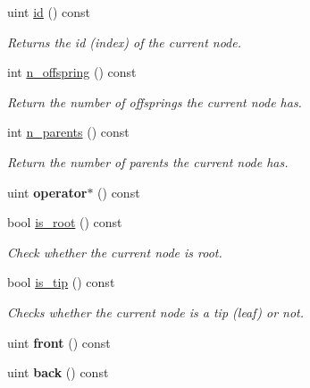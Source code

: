 \begin{DoxyCompactItemize}
uint \hyperlink{classTreeIterator_a6666dce3a0d78f229bd26942ebb3ad94}{id} () const
\begin{DoxyCompactList}\small\item\em Returns the id (index) of the current node. \end{DoxyCompactList}\item 
\mbox{\label{classTreeIterator_a5773c903501a1dc91b11429a365dcfab}} 
int \hyperlink{classTreeIterator_a5773c903501a1dc91b11429a365dcfab}{n\+\_\+offspring} () const
\begin{DoxyCompactList}\small\item\em Return the number of offsprings the current node has. \end{DoxyCompactList}\item 
\mbox{\label{classTreeIterator_a3f2217bed38e63f9adc7376ab2bc035f}} 
int \hyperlink{classTreeIterator_a3f2217bed38e63f9adc7376ab2bc035f}{n\+\_\+parents} () const
\begin{DoxyCompactList}\small\item\em Return the number of parents the current node has. \end{DoxyCompactList}\item 
\mbox{\label{classTreeIterator_ac82f114e4859065b81667013eba9b5d9}} 
uint {\bfseries operator$\ast$} () const
\item 
\mbox{\label{classTreeIterator_a975ec11f0ec121b0e5d0ebf0610c8f50}} 
bool \hyperlink{classTreeIterator_a975ec11f0ec121b0e5d0ebf0610c8f50}{is\+\_\+root} () const
\begin{DoxyCompactList}\small\item\em Check whether the current node is root. \end{DoxyCompactList}\item 
\mbox{\label{classTreeIterator_a988beb12324abb6c66f0a0f0f917f665}} 
bool \hyperlink{classTreeIterator_a988beb12324abb6c66f0a0f0f917f665}{is\+\_\+tip} () const
\begin{DoxyCompactList}\small\item\em Checks whether the current node is a tip (leaf) or not. \end{DoxyCompactList}\item 
\mbox{\label{classTreeIterator_acc88b486085d9a4a4f85e4c87bf1a5fc}} 
uint {\bfseries front} () const
\item 
\mbox{\label{classTreeIterator_a1305b8145e6af45414d282562710e1f2}} 
uint {\bfseries back} () const
\end{DoxyCompactItemize}
